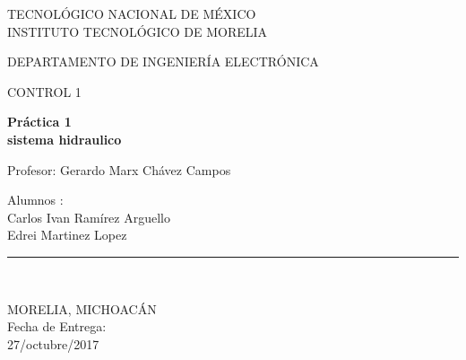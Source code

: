 \documentclass[12pt,a4paper]{report}
\begin{document}
\begin{titlepage}
\begin{center}
			TECNOLÓGICO NACIONAL DE MÉXICO\\
			\vspace*{0.15in}
			INSTITUTO TECNOLÓGICO DE MORELIA \\
			\vspace*{0.3in}
			\begin{large}
				DEPARTAMENTO DE INGENIERÍA ELECTRÓNICA\\
			\end{large}
			\vspace*{0.2in}
			\begin{large}
				CONTROL 1\\
			\end{large}
		\vspace*{0.3in}
			\begin{Large}
				\textbf{Práctica 1\\
				sistema hidraulico} \\
			\end{Large}
			\vspace*{0.3in}
			\begin{large}
			Profesor: Gerardo Marx Chávez Campos\\
			\end{large}
			\vspace*{0.2in}
		\begin{large}
			Alumnos : \\
			Carlos Ivan Ramírez Arguello\\
			Edrei Martinez Lopez \\
		\end{large}
			\vspace*{0.3in}
			\rule{80mm}{0.1mm}\\
			\vspace*{0.1in}
			\begin{large}
				MORELIA, MICHOACÁN \\
				Fecha de Entrega:\\
				27/octubre/2017 \\
			\end{large}
		\end{center}
	\end{titlepage}
\tableofcontents
\end{document}
